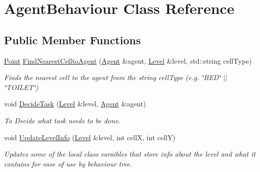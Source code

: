 \hypertarget{class_agent_behaviour}{}\section{Agent\+Behaviour Class Reference}
\label{class_agent_behaviour}
\subsection*{Public Member Functions}
\begin{DoxyCompactItemize}
\item 
\mbox{\label{class_agent_behaviour_afbb7103a8960b8b1982b71d25c036e71}} 
\hyperlink{class_point}{Point} \hyperlink{class_agent_behaviour_afbb7103a8960b8b1982b71d25c036e71}{Find\+Nearest\+Cellto\+Agent} (\hyperlink{class_agent}{Agent} \&agent, \hyperlink{class_level}{Level} \&level, std\+::string cell\+Type)
\begin{DoxyCompactList}\small\item\em Finds the nearest cell to the agent from the string cell\+Type (e.\+g. \char`\"{}\+B\+E\+D\char`\"{} $\vert$$\vert$ \char`\"{}\+T\+O\+I\+L\+E\+T\char`\"{}) \end{DoxyCompactList}\item 
\mbox{\label{class_agent_behaviour_a2a4f982b17f2bc0c7753aff6441d2667}} 
void \hyperlink{class_agent_behaviour_a2a4f982b17f2bc0c7753aff6441d2667}{Decide\+Task} (\hyperlink{class_level}{Level} \&level, \hyperlink{class_agent}{Agent} \&agent)
\begin{DoxyCompactList}\small\item\em To Decide what task needs to be done. \end{DoxyCompactList}\item 
\mbox{\label{class_agent_behaviour_a8f86aedeaebdab4553e0fe04e8593999}} 
void \hyperlink{class_agent_behaviour_a8f86aedeaebdab4553e0fe04e8593999}{Update\+Level\+Info} (\hyperlink{class_level}{Level} \&level, int cellX, int cellY)
\begin{DoxyCompactList}\small\item\em Updates some of the local class varaibles that store info about the level and what it contains for ease of use by behaviour tree. \end{DoxyCompactList}\end{DoxyCompactItemize}
